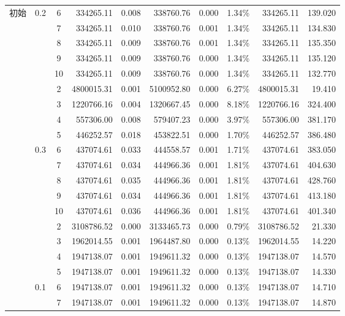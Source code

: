 {\begin{longtable}{cccrcrrcrr}
	\multicolumn{1}{l}{初始} & 0.2   & 6     & 334265.11 & 0.008 & 338760.76 & 0.000 & 1.34\% & 334265.11 & 139.020 \\
		&       & 7     & 334265.11 & 0.010 & 338760.76 & 0.001 & 1.34\% & 334265.11 & 134.830 \\
		&       & 8     & 334265.11 & 0.009 & 338760.76 & 0.001 & 1.34\% & 334265.11 & 135.350 \\
		&       & 9     & 334265.11 & 0.009 & 338760.76 & 0.000 & 1.34\% & 334265.11 & 135.120 \\
		&       & 10    & 334265.11 & 0.009 & 338760.76 & 0.000 & 1.34\% & 334265.11 & 132.770 \\
		&       & 2     & 4800015.31 & 0.001 & 5100952.80 & 0.000 & 6.27\% & 4800015.31 & 19.410 \\
		&       & 3     & 1220766.16 & 0.004 & 1320667.45 & 0.000 & 8.18\% & 1220766.16 & 324.400 \\
		&       & 4     & 557306.00 & 0.008 & 579407.23 & 0.000 & 3.97\% & 557306.00 & 381.170 \\
		&       & 5     & 446252.57 & 0.018 & 453822.51 & 0.000 & 1.70\% & 446252.57 & 386.480 \\
		& 0.3   & 6     & 437074.61 & 0.033 & 444558.57 & 0.001 & 1.71\% & 437074.61 & 383.050 \\
		&       & 7     & 437074.61 & 0.034 & 444966.36 & 0.001 & 1.81\% & 437074.61 & 404.630 \\
		&       & 8     & 437074.61 & 0.035 & 444966.36 & 0.001 & 1.81\% & 437074.61 & 428.760 \\
		&       & 9     & 437074.61 & 0.034 & 444966.36 & 0.001 & 1.81\% & 437074.61 & 413.180 \\
		&       & 10    & 437074.61 & 0.036 & 444966.36 & 0.001 & 1.81\% & 437074.61 & 401.340 \\
		\cmidrule(r){3-10}
		&       & 2     & 3108786.52 & 0.000 & 3133465.73 & 0.000 & 0.79\% & 3108786.52 & 21.330 \\
		&       & 3     & 1962014.55 & 0.001 & 1964487.80 & 0.000 & 0.13\% & 1962014.55 & 14.220 \\
		&       & 4     & 1947138.07 & 0.001 & 1949611.32 & 0.000 & 0.13\% & 1947138.07 & 14.570 \\
		&       & 5     & 1947138.07 & 0.001 & 1949611.32 & 0.000 & 0.13\% & 1947138.07 & 14.330 \\
		& 0.1   & 6     & 1947138.07 & 0.001 & 1949611.32 & 0.000 & 0.13\% & 1947138.07 & 14.710 \\
		&       & 7     & 1947138.07 & 0.001 & 1949611.32 & 0.000 & 0.13\% & 1947138.07 & 14.870 \\

\end{longtable}}

